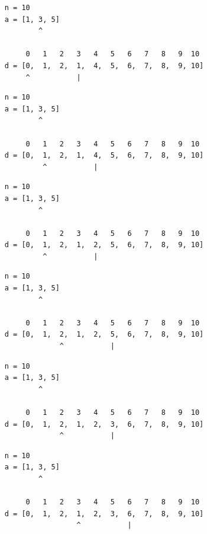\begin{frame}[fragile]
\begin{verbatim}
     n = 10
     a = [1, 3, 5]
             ^

          0   1   2   3   4   5   6   7   8   9  10
     d = [0,  1,  2,  1,  4,  5,  6,  7,  8,  9, 10]
          ^           |
\end{verbatim}
\end{frame}
\addtocounter{framenumber}{-1}

\begin{frame}[fragile]
\begin{verbatim}
     n = 10
     a = [1, 3, 5]
             ^

          0   1   2   3   4   5   6   7   8   9  10
     d = [0,  1,  2,  1,  4,  5,  6,  7,  8,  9, 10]
              ^           |
\end{verbatim}
\end{frame}
\addtocounter{framenumber}{-1}

\begin{frame}[fragile]
\begin{verbatim}
     n = 10
     a = [1, 3, 5]
             ^

          0   1   2   3   4   5   6   7   8   9  10
     d = [0,  1,  2,  1,  2,  5,  6,  7,  8,  9, 10]
              ^           |
\end{verbatim}
\end{frame}
\addtocounter{framenumber}{-1}

\begin{frame}[fragile]
\begin{verbatim}
     n = 10
     a = [1, 3, 5]
             ^

          0   1   2   3   4   5   6   7   8   9  10
     d = [0,  1,  2,  1,  2,  5,  6,  7,  8,  9, 10]
                  ^           |
\end{verbatim}
\end{frame}
\addtocounter{framenumber}{-1}

\begin{frame}[fragile]
\begin{verbatim}
     n = 10
     a = [1, 3, 5]
             ^

          0   1   2   3   4   5   6   7   8   9  10
     d = [0,  1,  2,  1,  2,  3,  6,  7,  8,  9, 10]
                  ^           |
\end{verbatim}
\end{frame}
\addtocounter{framenumber}{-1}

\begin{frame}[fragile]
\begin{verbatim}
     n = 10
     a = [1, 3, 5]
             ^

          0   1   2   3   4   5   6   7   8   9  10
     d = [0,  1,  2,  1,  2,  3,  6,  7,  8,  9, 10]
                      ^           |
\end{verbatim}
\end{frame}
\addtocounter{framenumber}{-1}

